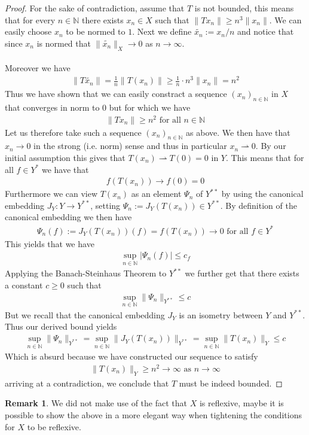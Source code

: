 \documentclass[12pt,a4paper]{article}
\theoremstyle{definition}
\newtheorem{rem}{Remark}[section]
\newcommand{\wto}{\rightharpoonup}
\begin{document}
\begin{proof}
For the sake of contradiction, assume that $T$ is not bounded, this means that for every $n \in \mathbb{N}$ there exists $x_n \in X$ such that  $\|Tx_n \| \geq n^3 \| x_n\|$. We can easily choose $x_n$ to be normed to $1$. Next we define $\tilde{x_n} := x_n/n$ and notice that since $x_n$ is normed that $\| \tilde{x_n} \|_X \to 0$ as $n \to \infty$. 
\\\\
Moreover we have
\begin{align*}
\| T \tilde{x_n} \| = \frac{1}{n} \| T (x_n)\| \geq \frac{1}{n} \cdot n^3 \|x_n \| = n^2
\end{align*}
Thus we have shown that we can easily constract a sequence $(x_n)_{n \in \mathbb{N}}$ in $X$ that converges in norm to $0$ but for which we have 
\begin{align*}
\| T x_n \| \geq n^2 \text{ for all } n \in \mathbb{N}
\end{align*}
Let us therefore take such a sequence $(x_n)_{n \in \mathbb{N}}$ as above. We then have that $x_n \to 0$ in the strong (i.e. norm) sense and thus in particular $x_n \wto 0$. By our initial assumption this gives that $T(x_n) \wto T(0)=0$ in $Y$. This means that for all $f \in Y^*$ we have that 
\begin{align*}
f(T(x_n)) \to f(0)=0 
\end{align*}
Furthermore we can view $T(x_n)$ as an element $\Psi_n$ of $Y^{**}$ by using the canonical embedding $J_Y : Y \to Y^{**}$, setting $\Psi_n:= J_Y(T(x_n)) \in Y^{**}$. By definition of the canonical embedding we then have
\begin{align*}
\Psi_n(f) := J_Y(T(x_n))(f)=f(T(x_n))  \to 0 \text{ for all } f \in Y^*
\end{align*}
This yields that we have
\begin{align*}
\sup_{n \in \mathbb{N}} | \Psi_n(f)| \leq c_f
\end{align*}
Applying the Banach-Steinhaus Theorem to $Y^{**}$ we further get that there exists a constant $c \geq 0$ such that  
\begin{align*}
\sup_{n \in \mathbb{N}} \| \Psi_n\|_{Y^{**}} \leq c
\end{align*}
\newpage
But we recall that the canonical embedding $J_Y$ is an isometry between $Y$ and $Y^{**}$. Thus our derived bound yields
\begin{align*}
\sup_{n \in \mathbb{N}} \|\Psi_n\|_{Y^{**}}= \sup_{n \in \mathbb{N}} \| J_Y(T(x_n))\|_{Y^{**}} =\sup_{n \in \mathbb{N}} \| T(x_n)\|_Y \leq c
\end{align*}
Which is absurd because we have constructed our sequence to satisfy \begin{align*}
\|T (x_n)\|_Y \geq n^2 \to \infty \text{ as } n \to \infty
\end{align*}
arriving at a contradiction, we conclude that $T$ must be indeed bounded. 
\end{proof}
\begin{rem} We did not make use of the fact that $X$ is reflexive, maybe it is possible to show the above in a more elegant way when tightening the conditions for $X$ to be reflexive. 
\end{rem}
\newpage
\end{document}

